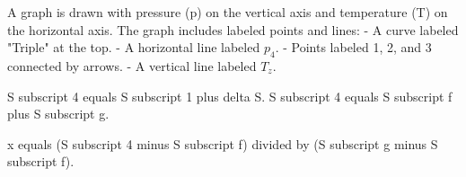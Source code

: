 A graph is drawn with pressure (p) on the vertical axis and temperature (T) on the horizontal axis. The graph includes labeled points and lines:  
- A curve labeled "Triple" at the top.  
- A horizontal line labeled \( p_4 \).  
- Points labeled 1, 2, and 3 connected by arrows.  
- A vertical line labeled \( T_z \).

S subscript 4 equals S subscript 1 plus delta S.  
S subscript 4 equals S subscript f plus S subscript g.  

x equals (S subscript 4 minus S subscript f) divided by (S subscript g minus S subscript f).